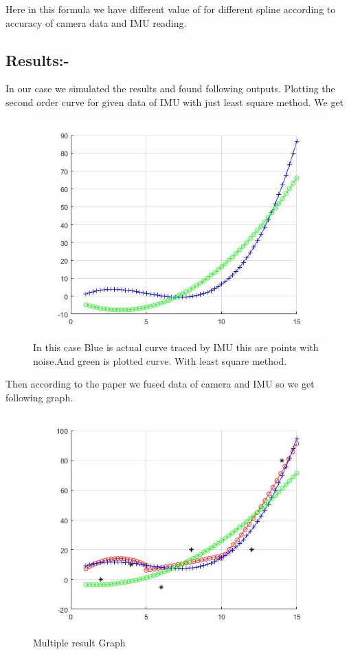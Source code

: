  Here in this formula we have different value of  for different spline according to accuracy of camera data and IMU reading.
 
 \subsection{Results:-}
 
 In our case we simulated the results and found following outputs.
Plotting the second order curve for given data of IMU with just least square method. We get

\begin{figure}
\includegraphics{./figures/lsm.jpg}
\caption{In this case Blue is actual curve traced by IMU this are points with noise.And green is plotted curve. With least square method.}
\end{figure}

Then according to the paper we fused data of camera and IMU so we get following graph.

\begin{figure}
\includegraphics{./figures/AllOutput.jpg}
\caption{Multiple result Graph}
\end{figure}


